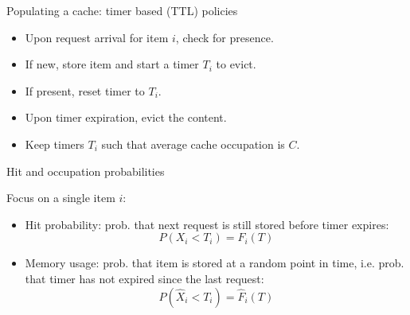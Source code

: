 \documentclass[aspectratio=169]{beamer}
\begin{document}
\begin{frame}{Populating a cache: timer based (TTL) policies}
		
	\begin{itemize}
		\item<1-> Upon request arrival for item $i$, check for presence.
		\item<2-> If new, store item and start a \alert{timer} $T_i$ to evict.
		\item<3-> If present, reset timer to $T_i$.
		\item<4-> Upon timer expiration, evict the content.
		\item<5-> Keep timers $T_i$ such that \alert{average} cache occupation is $C$.
	\end{itemize}
	
	\vspace{3em}
	
	\centering
	
\end{frame}

\begin{frame}{Hit and occupation probabilities}

	Focus on a single item $i$:

	\bigskip

	\begin{itemize}

		\item \alert{Hit probability:} prob. that \alert{next request} is still stored before timer expires:
			\begin{equation*}
				P(X_i<T_i) = F_i(T)
			\end{equation*}
		
		\item \alert{Memory usage:} prob. that item is stored at a random point in time, i.e. prob. that timer \alert{has not expired} since the last request:
		\begin{equation*}
			P(\hat{X}_i<T_i) = \hat{F}_i(T)
		\end{equation*}
	 
	\end{itemize}

\end{frame}
\end{document}

